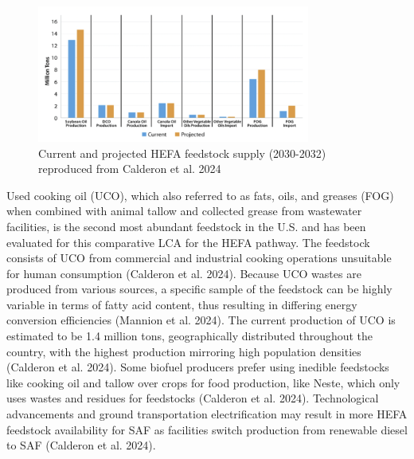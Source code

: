 \documentclass[12pt]{article}
\begin{document}
\begin{figure}[H]
\centering
\includegraphics[width=0.8\textwidth]{Fig 5.png} %
\caption{Current and projected HEFA feedstock supply (2030-2032) reproduced from Calderon et al. 2024}
\label{figure 5}
\end{figure}


Used cooking oil (UCO), which also referred to as fats, oils, and greases (FOG) when combined with animal tallow and collected grease from wastewater facilities, is the second most abundant feedstock in the U.S. and has been evaluated for this comparative LCA for the HEFA pathway. The feedstock consists of UCO from commercial and industrial cooking operations unsuitable for human consumption (Calderon et al. 2024). Because UCO wastes are produced from various sources, a specific sample of the feedstock can be highly variable in terms of fatty acid content, thus resulting in differing energy conversion efficiencies (Mannion et al. 2024). The current production of UCO is estimated to be 1.4 million tons, geographically distributed throughout the country, with the highest production mirroring high population densities (Calderon et al. 2024).  Some biofuel producers prefer using inedible feedstocks like cooking oil and tallow over crops for food production, like Neste, which only uses wastes and residues for feedstocks (Calderon et al. 2024). Technological advancements and ground transportation electrification may result in more HEFA feedstock availability for SAF as facilities switch production from renewable diesel to SAF (Calderon et al. 2024). 
\end{document}
